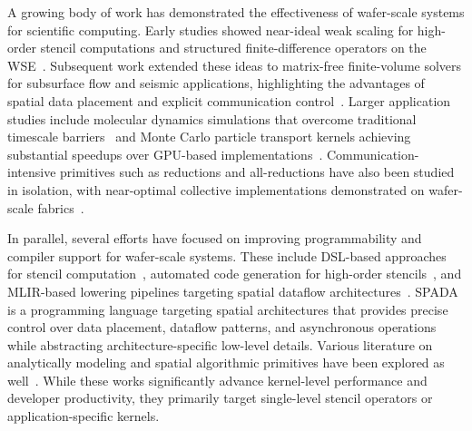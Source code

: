 \documentclass[sigconf]{acmart}
\begin{document}

A growing body of work has demonstrated the effectiveness of wafer-scale systems for scientific computing. Early studies showed near-ideal weak scaling for high-order stencil computations and structured finite-difference operators on the WSE~\cite{scalable_25pt_stencil,Rocki,mathias,Sai,sai2}. Subsequent work extended these ideas to matrix-free finite-volume solvers for subsurface flow and seismic applications, highlighting the advantages of spatial data placement and explicit communication control~\cite{sai_fv_arxiv,Ltaief}. Larger application studies include molecular dynamics simulations that overcome traditional timescale barriers~\cite{perez_md_sc24,perez-journal} and Monte Carlo particle transport kernels achieving substantial speedups over GPU-based implementations~\cite{Tramm24,Yoshii26}. Communication-intensive primitives such as reductions and all-reductions have also been studied in isolation, with near-optimal collective implementations demonstrated on wafer-scale fabrics~\cite{luczynski_reduce}.

In parallel, several efforts have focused on improving programmability and compiler support for wafer-scale systems. These include DSL-based approaches for stencil computation~\cite{brown}, automated code generation for high-order stencils~\cite{sai_codegen_sc24}, and MLIR-based lowering pipelines targeting spatial dataflow architectures~\cite{stawinoga_mlir_stencils_wse}.
SPADA~\cite{spada} is a programming language targeting spatial architectures that provides precise control over data placement, dataflow patterns, and asynchronous operations while abstracting architecture-specific low-level details. Various literature on analytically modeling and spatial algorithmic primitives have been explored as well~\cite{gianinazzi_spatialcomputer, gianinazzi2025energy, baumann2024low, luczynski_reduce}.
While these works significantly advance kernel-level performance and developer productivity, they primarily target single-level stencil operators or application-specific kernels.%
\end{document}
